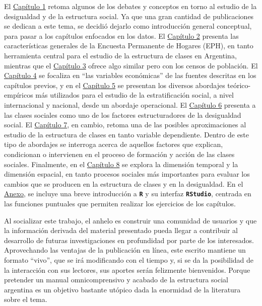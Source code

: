 \documentclass[
]{article}
\begin{document}
El \protect\hyperlink{analisis1}{Capítulo 1} retoma algunos de los debates y conceptos en torno al estudio de la desigualdad y de la estructura social. Ya que una gran cantidad de publicaciones se dedican a este tema, se decidió dejarlo como introducción general conceptual, para pasar a los capítulos enfocados en los datos. El \protect\hyperlink{fuentes}{Capítulo 2} presenta las características generales de la Encuesta Permanente de Hogares (EPH), en tanto herramienta central para el estudio de la estructura de clases en Argentina, mientras que el \protect\hyperlink{fuentes2}{Capítulo 3} ofrece algo similar pero con los censos de población. El \protect\hyperlink{ocupacion}{Capítulo 4} se focaliza en ``las variables económicas'' de las fuentes descritas en los capítulos previos, y en el \protect\hyperlink{clases5}{Capítulo 5} se presentan los diversos abordajes teórico-empíricos más utilizados para el estudio de la estratificación social, a nivel internacional y nacional, desde un abordaje operacional. El \protect\hyperlink{independiente}{Capítulo 6} presenta a las clases sociales como uno de los factores estructuradores de la desigualdad social. El \protect\hyperlink{dependiente}{Capítulo 7}, en cambio, retoma una de las posibles aproximaciones al estudio de la estructura de clases en tanto variable dependiente. Dentro de este tipo de abordajes se interroga acerca de aquellos factores que explican, condicionan o intervienen en el proceso de formación y acción de las clases sociales. Finalmente, en el \protect\hyperlink{tiempo}{Capítulo 8} se explora la dimensión temporal y la dimensión espacial, en tanto procesos sociales más importantes para evaluar los cambios que se producen en la estructura de clases y en la desigualdad. En el \protect\hyperlink{anexo}{Anexo}, se incluye una breve introducción a \textbf{\texttt{R}} y su interfaz \textbf{\texttt{RStudio}}, centrada en las funciones puntuales que permiten realizar los ejercicios de los capítulos.

Al socializar este trabajo, el anhelo es construir una comunidad de usuarios y que la información derivada del material presentado pueda llegar a contribuir al desarrollo de futuras investigaciones en profundidad por parte de los interesados. Aprovechando las ventajas de la publicación en línea, este escrito mantiene un formato ``vivo'', que se irá modificando con el tiempo y, si se da la posibilidad de la interacción con sus lectores, sus aportes serán felizmente bienvenidos. Porque pretender un manual omnicomprensivo y acabado de la estructura social argentina es un objetivo bastante utópico dada la enormidad de la literatura sobre el tema.
\end{document}

